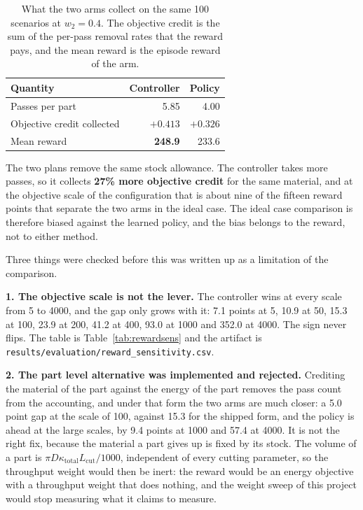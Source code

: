 \documentclass[11pt,a4paper]{article}
\newcommand{\alert}[1]{\textcolor{IITGold}{\textbf{#1}}}
\begin{document}
\begin{table}[H]
\centering
\caption{What the two arms collect on the same 100 scenarios at $w_2 = 0.4$. The objective credit is the sum of the per-pass removal rates that the reward pays, and the mean reward is the episode reward of the arm.}
\label{tab:ratecredit}
\begin{tabular}{@{}lrr@{}}
\toprule
\textbf{Quantity} & \textbf{Controller} & \textbf{Policy} \\
\midrule
Passes per part & 5.85 & 4.00 \\
Objective credit collected & $+0.413$ & $+0.326$ \\
Mean reward & \alert{248.9} & 233.6 \\
\bottomrule
\end{tabular}
\end{table}

The two plans remove the same stock allowance. The controller takes more passes, so it collects \alert{27\% more objective credit} for the same material, and at the objective scale of the configuration that is about nine of the fifteen reward points that separate the two arms in the ideal case. The ideal case comparison is therefore biased against the learned policy, and the bias belongs to the reward, not to either method.

Three things were checked before this was written up as a limitation of the comparison.

\textbf{1. The objective scale is not the lever.} The controller wins at every scale from 5 to 4000, and the gap only grows with it: 7.1 points at 5, 10.9 at 50, 15.3 at 100, 23.9 at 200, 41.2 at 400, 93.0 at 1000 and 352.0 at 4000. The sign never flips. The table is Table~\ref{tab:rewardsens} and the artifact is \texttt{results/\allowbreak evaluation/\allowbreak reward\_sensitivity.csv}.

\textbf{2. The part level alternative was implemented and rejected.} Crediting the material of the part against the energy of the part removes the pass count from the accounting, and under that form the two arms are much closer: a 5.0 point gap at the scale of 100, against 15.3 for the shipped form, and the policy is ahead at the large scales, by 9.4 points at 1000 and 57.4 at 4000. It is not the right fix, because the material a part gives up is fixed by its stock. The volume of a part is $\pi D \kappa_\text{total} L_\text{cut}/1000$, independent of every cutting parameter, so the throughput weight would then be inert: the reward would be an energy objective with a throughput weight that does nothing, and the weight sweep of this project would stop measuring what it claims to measure.
\end{document}
